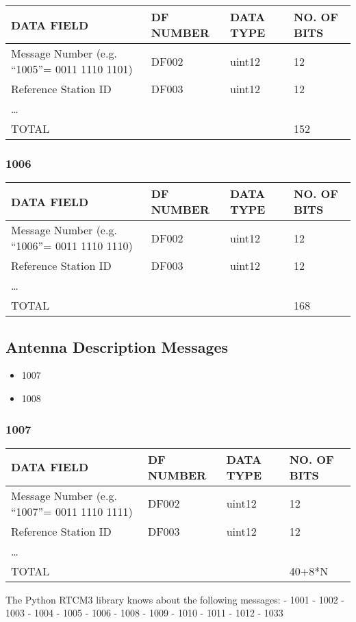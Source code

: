 \begin{longtable}[]{@{}llll@{}}
\toprule
DATA FIELD & DF NUMBER & DATA TYPE & NO. OF BITS\tabularnewline
\midrule
\endhead
Message Number (e.g. ``1005''= 0011 1110 1101) & DF002 & uint12 &
12\tabularnewline
Reference Station ID & DF003 & uint12 & 12\tabularnewline
\ldots{} & & &\tabularnewline
TOTAL & & & 152\tabularnewline
\bottomrule
\end{longtable}

\hypertarget{section-1}{\subsubsection{1006}\label{section-1}}

\begin{longtable}[]{@{}llll@{}}
\toprule
DATA FIELD & DF NUMBER & DATA TYPE & NO. OF BITS\tabularnewline
\midrule
\endhead
Message Number (e.g. ``1006''= 0011 1110 1110) & DF002 & uint12 &
12\tabularnewline
Reference Station ID & DF003 & uint12 & 12\tabularnewline
\ldots{} & & &\tabularnewline
TOTAL & & & 168\tabularnewline
\bottomrule
\end{longtable}

\subsection{Antenna Description
Messages}\label{antenna-description-messages}

\begin{itemize}
\item
  1007
\item
  1008
\end{itemize}

\subsubsection{1007}\label{section-2}

\begin{longtable}[]{@{}llll@{}}
\toprule
DATA FIELD & DF NUMBER & DATA TYPE & NO. OF BITS\tabularnewline
\midrule
\endhead
Message Number (e.g. ``1007''= 0011 1110 1111) & DF002 & uint12 &
12\tabularnewline
Reference Station ID & DF003 & uint12 & 12\tabularnewline
\ldots{} & & &\tabularnewline
TOTAL & & & 40+8*N\tabularnewline
\bottomrule
\end{longtable}

The Python RTCM3 library knows about the following messages: - 1001 -
1002 - 1003 - 1004 - 1005 - 1006 - 1008 - 1009 - 1010 - 1011 - 1012 -
1033

